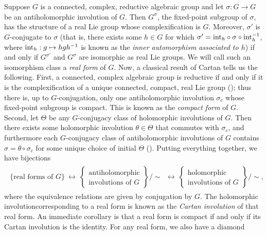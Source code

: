 \noindent\begin{remark}\label{CartanInvolution} Suppose $G$ is a connected, complex, reductive algebraic group and let $\sigma : G \to G$ be an antiholomorphic involution of $G$. Then $G^\sigma$, the fixed-point subgroup of $\sigma$, has the structure of a real Lie group whose complexification is $G$. Moreover, $\sigma'$ is $G$-conjugate to $\sigma$ (that is, there exists some $h \in G$ for which $\sigma' = \textup{int}_h\circ\sigma\circ\textup{int}_h^{-1}$, where $\textup{int}_h : g \mapsto hgh^{-1}$ is known as the {\em inner automorphism associated to $h$}) if and only if $G^{\sigma'}$ and $G^\sigma$ are isomorphic as real Lie groups. We will call such an isomorphism class a {\em real form} of $G$. Now, a classical result of Cartan tells us the following. First, a connected, complex algebraic group is reductive if and only if it is the complexification of a unique connected, compact, real Lie group (\cite[p.\ 34]{Kam11}); thus there is, up to $G$-conjugation, only one antiholomorphic involution $\sigma_c$ whose fixed-point subgroup is compact. This is known as the {\em compact form} of $G$. Second, let $\Theta$ be any $G$-conjugacy class of holomorphic involutions of $G$. Then there exists some holomorphic involution $\theta \in \Theta$ that commutes with $\sigma_c$, and furthermore each $G$-conjugacy class of antiholomorphic involutions of $G$ contains $\sigma = \theta \circ \sigma_c$ for some unique choice of initial $\Theta$ (\cite{Ada14}). Putting everything together, we have bijections
\begin{align*}
\begin{split}
\{\text{real forms of $G$}\}\ \longleftrightarrow\ \left\{\begin{matrix}\text{antiholomorphic}\\\text{involutions of $G$}\end{matrix}\right\}\!\big/\!\!\sim\ \ \longleftrightarrow\ \left\{\begin{matrix}\text{holomorphic}\\\text{involutions of $G$}\end{matrix}\right\}\!\big/\!\!\sim,
\end{split}
\end{align*}
\noindent where the equivalence relations are given by conjugation by $G$. The holomorphic involution\linebreak corresponding to a real form is known as the {\em Cartan involution} of that real form. An immediate corollary is that a real form is compact if and only if its Cartan involution is the identity. For any real form, we also have a diamond

\end{remark}
